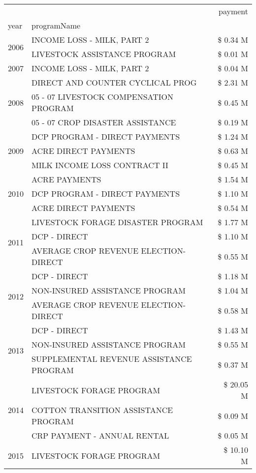 \begin{tabular}{llr}
\toprule
 &  & payment \\
year & programName &  \\
\midrule
\multirow[t]{2}{*}{2006} & INCOME LOSS - MILK, PART 2 & \$ 0.34 M \\
 & LIVESTOCK ASSISTANCE PROGRAM & \$ 0.01 M \\
\cline{1-3}
2007 & INCOME LOSS - MILK, PART 2 & \$ 0.04 M \\
\cline{1-3}
\multirow[t]{3}{*}{2008} & DIRECT AND COUNTER CYCLICAL PROG & \$ 2.31 M \\
 & 05 - 07 LIVESTOCK COMPENSATION PROGRAM & \$ 0.45 M \\
 & 05 - 07 CROP DISASTER ASSISTANCE & \$ 0.19 M \\
\cline{1-3}
\multirow[t]{3}{*}{2009} & DCP PROGRAM - DIRECT PAYMENTS & \$ 1.24 M \\
 & ACRE DIRECT PAYMENTS & \$ 0.63 M \\
 & MILK INCOME LOSS CONTRACT II & \$ 0.45 M \\
\cline{1-3}
\multirow[t]{3}{*}{2010} & ACRE PAYMENTS & \$ 1.54 M \\
 & DCP PROGRAM - DIRECT PAYMENTS & \$ 1.10 M \\
 & ACRE DIRECT PAYMENTS & \$ 0.54 M \\
\cline{1-3}
\multirow[t]{3}{*}{2011} & LIVESTOCK FORAGE DISASTER PROGRAM & \$ 1.77 M \\
 & DCP - DIRECT & \$ 1.10 M \\
 & AVERAGE CROP REVENUE ELECTION-DIRECT & \$ 0.55 M \\
\cline{1-3}
\multirow[t]{3}{*}{2012} & DCP - DIRECT & \$ 1.18 M \\
 & NON-INSURED ASSISTANCE PROGRAM & \$ 1.04 M \\
 & AVERAGE CROP REVENUE ELECTION-DIRECT & \$ 0.58 M \\
\cline{1-3}
\multirow[t]{3}{*}{2013} & DCP - DIRECT & \$ 1.43 M \\
 & NON-INSURED ASSISTANCE PROGRAM & \$ 0.55 M \\
 & SUPPLEMENTAL REVENUE ASSISTANCE PROGRAM & \$ 0.37 M \\
\cline{1-3}
\multirow[t]{3}{*}{2014} & LIVESTOCK FORAGE PROGRAM & \$ 20.05 M \\
 & COTTON TRANSITION ASSISTANCE PROGRAM & \$ 0.09 M \\
 & CRP PAYMENT - ANNUAL RENTAL & \$ 0.05 M \\
\cline{1-3}
\multirow[t]{3}{*}{2015} & LIVESTOCK FORAGE PROGRAM & \$ 10.10 M \\

\end{tabular}
